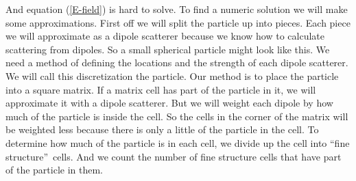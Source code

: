 \documentclass{article}
\begin{document}
And equation (\ref{E-field}) is hard to solve. To find a numeric solution we
will make some approximations. First off we will split the particle up into
pieces. Each piece we will approximate as a dipole scatterer because we know
how to calculate scattering from dipoles. So a small spherical particle
might look like this. We need a method of defining the
locations and the strength of each dipole scatterer. We will call this
discretization the particle. Our method is to place the particle into a
square matrix. If a matrix cell has part of the
particle in it, we will approximate it with a dipole scatterer. But we will
weight each dipole by how much of the particle is inside the cell. So the
cells in the corner of the matrix will be weighted less because there is
only a little of the particle in the cell. To determine how much of the
particle is in each cell, we divide up the cell into \textquotedblleft fine
structure\textquotedblright\ cells. And we count the number of fine
structure cells that have part of the particle in them.

\end{document}
